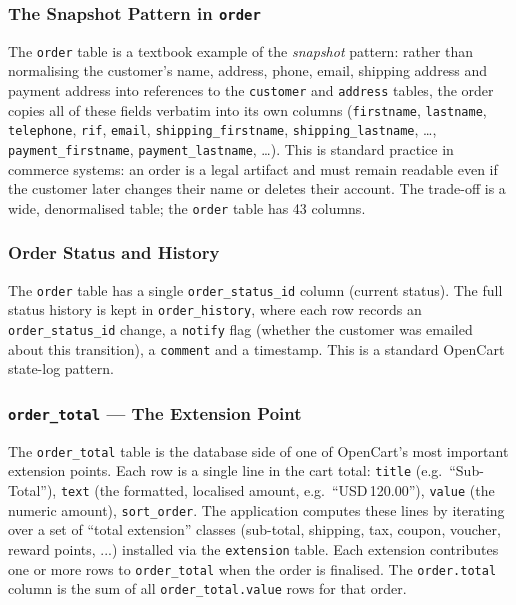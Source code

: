 \documentclass[11pt,a4paper]{article}
\begin{document}
\subsubsection{The Snapshot Pattern in \texttt{order}}

The \texttt{order} table is a textbook example of the \emph{snapshot}
pattern: rather than normalising the customer's name, address, phone,
email, shipping address and payment address into references to the
\texttt{customer} and \texttt{address} tables, the order copies all of
these fields verbatim into its own columns
(\texttt{firstname}, \texttt{lastname}, \texttt{telephone}, \texttt{rif},
\texttt{email}, \texttt{shipping\_firstname}, \texttt{shipping\_lastname},
\ldots, \texttt{payment\_firstname}, \texttt{payment\_lastname}, \ldots).
This is standard practice in commerce systems: an order is a legal
artifact and must remain readable even if the customer later changes
their name or deletes their account. The trade-off is a wide, denormalised
table; the \texttt{order} table has 43 columns.

\subsubsection{Order Status and History}

The \texttt{order} table has a single \texttt{order\_status\_id}
column (current status). The full status history is kept in
\texttt{order\_history}, where each row records an
\texttt{order\_status\_id} change, a \texttt{notify} flag (whether
the customer was emailed about this transition), a \texttt{comment}
and a timestamp. This is a standard OpenCart state-log pattern.

\subsubsection{\texttt{order\_total} --- The Extension Point}

The \texttt{order\_total} table is the database side of one of
OpenCart's most important extension points. Each row is a single
line in the cart total: \texttt{title} (e.g.\ ``Sub-Total''),
\texttt{text} (the formatted, localised amount, e.g.\ ``USD\,120.00''),
\texttt{value} (the numeric amount), \texttt{sort\_order}. The
application computes these lines by iterating over a set of
``total extension'' classes (sub-total, shipping, tax, coupon,
voucher, reward points, ...) installed via the
\texttt{extension} table. Each extension contributes one or more
rows to \texttt{order\_total} when the order is finalised. The
\texttt{order.total} column is the sum of all
\texttt{order\_total.value} rows for that order.
\end{document}
